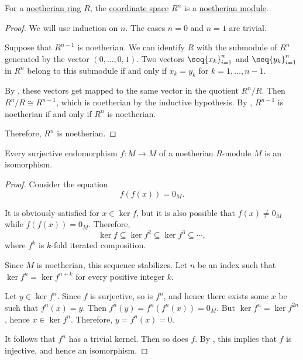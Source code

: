 \begin{proposition}\label{thm:noetherian_free_module}
  For a \hyperref[def:noetherian_semiring]{noetherian ring} \( R \), the \hyperref[def:sequence_space]{coordinate space} \( R^n \) is a \hyperref[def:noetherian_semimodule]{noetherian module}.
\end{proposition}
\begin{proof}
  We will use induction on \( n \). The cases \( n = 0 \) and \( n = 1 \) are trivial.

  Suppose that \( R^{n-1} \) is noetherian. We can identify \( R \) with the submodule of \( R^n \) generated by the vector \( (0, \ldots, 0, 1) \). Two vectors \( \seq{ x_k }_{i=1}^n \) and  \( \seq{ y_k }_{i=1}^n \) in \( R^n \) belong to this submodule if and only if \( x_k = y_k \) for \( k = 1, \ldots, n - 1 \).

  By , these vectors get mapped to the same vector in the quotient \( R^n / R \). Then \( R^n / R \cong R^{n-1} \), which is noetherian by the inductive hypothesis. By , \( R^{n-1} \) is noetherian if and only if \( R^n \) is noetherian.

  Therefore, \( R^n \) is noetherian.
\end{proof}

\begin{lemma}\label{thm:surjective_endomorphism_over_noetherian_module}
  Every surjective endomorphism \( f: M \to M \) of a noetherian \( R \)-module \( M \) is an isomorphism.
\end{lemma}
\begin{proof}
  Consider the equation
  \begin{equation*}
    f(f(x)) = 0_M.
  \end{equation*}

  It is obviously satisfied for \( x \in \ker f \), but it is also possible that \( f(x) \neq 0_M \) while \( f(f(x)) = 0_M \). Therefore,
  \begin{equation*}
    \ker f \subseteq \ker f^2 \subseteq \ker f^3 \subseteq \cdots,
  \end{equation*}
  where \( f^k \) is \( k \)-fold iterated composition.

  Since \( M \) is noetherian, this sequence stabilizes. Let \( n \) be an index such that \( \ker f^n = \ker f^{n + k} \) for every positive integer \( k \).

  Let \( y \in \ker f^n \). Since \( f \) is surjective, so is \( f^n \), and hence there exists some \( x \) be such that \( f^n(x) = y \). Then \( f^n(y) = f^n(f^n(x)) = 0_M \). But \( \ker f^n = \ker f^{2n} \), hence \( x \in \ker f^n \). Therefore, \( y = f^n(x) = 0 \).

  It follows that \( f^n \) has a trivial kernel. Then so does \( f \). By , this implies that \( f \) is injective, and hence an isomorphism.
\end{proof}

